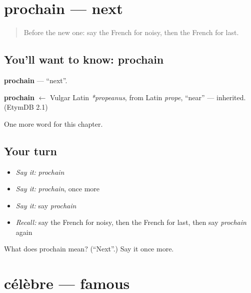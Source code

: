 \section[prochain]{prochain — next}

\label{lesson:FR-C132-prochain}



\begin{quote}
Before the new one: say the French for noisy, then the French for last.
\end{quote}

\subsection*{You'll want to know: prochain}
\textbf{prochain} — \textquotedblleft{}next\textquotedblright{}.

\begin{cousinweb}
\textbf{prochain} $\leftarrow$ Vulgar Latin \emph{*propeanus}, from Latin \emph{prope}, \textquotedblleft{}near\textquotedblright{} — inherited. (EtymDB 2.1)
\end{cousinweb}

\begin{grammarlens}[title={What you've built}]
One more word for this chapter.
\end{grammarlens}

\subsection*{Your turn}
\begin{itemize}
\raggedright
  \item \emph{Say it:} \emph{prochain}
  \item \emph{Say it:} \emph{prochain}, once more
  \item \emph{Say it:} say \emph{prochain}
  \item \emph{Recall:} say the French for noisy, then the French for last, then say \emph{prochain} again
\end{itemize}

\begin{tcolorbox}[breakable,colback=teal!4,colframe=teal!35!black,title={Before you move on}]
What does prochain mean? (\textquotedblleft{}Next\textquotedblright{}.) Say it once more.
\end{tcolorbox}
\section[célèbre]{célèbre — famous}

